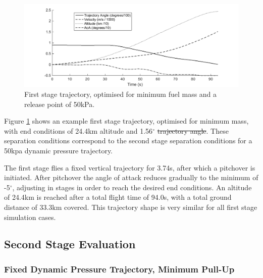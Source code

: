 \documentclass[journal]{new-aiaa}
\providecommand{\DIFadd}[1]{{\protect\color{blue}\uwave{#1}}} %
\providecommand{\DIFdel}[1]{{\protect\color{red}\sout{#1}}}                      %
\providecommand{\DIFaddbegin}{} %
\providecommand{\DIFaddend}{} %
\providecommand{\DIFdelbegin}{} %
\providecommand{\DIFdelend}{} %
\newcommand{\DIFscaledelfig}{0.5}
\newlength{\DIFdelgraphicswidth} %
\newlength{\DIFdelgraphicsheight} %
\newcommand{\DIFaddincludegraphics}[2][]{{\color{blue}\fbox{\DIFOincludegraphics[#1]{#2}}}} %
\newcommand{\DIFdelincludegraphics}[2][]{%
\sbox{\DIFdelgraphicsbox}{\DIFOincludegraphics[#1]{#2}}%
\settoboxwidth{\DIFdelgraphicswidth}{\DIFdelgraphicsbox} %
\settoboxtotalheight{\DIFdelgraphicsheight}{\DIFdelgraphicsbox} %
\scalebox{\DIFscaledelfig}{%
\parbox[b]{\DIFdelgraphicswidth}{\usebox{\DIFdelgraphicsbox}\\[-\baselineskip] \rule{\DIFdelgraphicswidth}{0em}}\llap{\resizebox{\DIFdelgraphicswidth}{\DIFdelgraphicsheight}{%
\setlength{\unitlength}{\DIFdelgraphicswidth}%
\begin{picture}(1,1)%
\thicklines\linethickness{2pt} %
{\color[rgb]{1,0,0}\put(0,0){\framebox(1,1){}}}%
{\color[rgb]{1,0,0}\put(0,0){\line( 1,1){1}}}%
{\color[rgb]{1,0,0}\put(0,1){\line(1,-1){1}}}%
\end{picture}%
}\hspace*{3pt}}} %
} %
\DeclareRobustCommand{\DIFaddbegin}{\DIFOaddbegin \let\includegraphics\DIFaddincludegraphics} %
\DeclareRobustCommand{\DIFaddend}{\DIFOaddend \let\includegraphics\DIFOincludegraphics} %
\DeclareRobustCommand{\DIFdelbegin}{\DIFOdelbegin \let\includegraphics\DIFdelincludegraphics} %
\DeclareRobustCommand{\DIFdelend}{\DIFOaddend \let\includegraphics\DIFOincludegraphics} %
\begin{document}
\begin{figure}[H]
	\centering
	\includegraphics[width=.9\linewidth]{FirstStage}
	\caption{First stage trajectory, optimised for minimum fuel mass and a release point of 50kPa.}
	\label{fig:FirstStage}
\end{figure}

Figure \ref{fig:FirstStage} shows an example first stage trajectory, optimised for minimum mass, with end conditions of 24.4km altitude and 1.56$^\circ$ \DIFdelbegin \DIFdel{trajectory angle}\DIFdelend \DIFaddbegin \DIFadd{\textcolor{red}{flight path angle}}\DIFaddend . These separation conditions correspond to the second stage separation conditions for a 50kpa dynamic pressure trajectory.

The first stage flies a fixed vertical trajectory for 3.74s, after which a pitchover is initiated. 
After pitchover the angle of attack reduces gradually to the minimum of -5$^\circ$, adjusting in stages in order to reach the desired end conditions. 
An altitude of 24.4km is reached after a total flight time of 94.0s, with a total ground distance of 33.3km covered. 
This trajectory shape is very similar for all first stage simulation cases. 



\subsection{Second Stage Evaluation}
\subsubsection{Fixed Dynamic Pressure Trajectory, Minimum Pull-Up} \label{subsection:Fixed}
\end{document}

